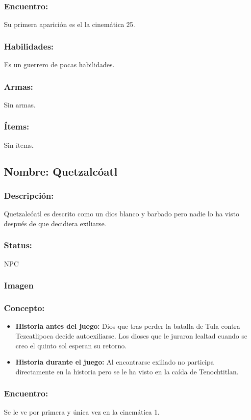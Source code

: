\documentclass[11pt,letterpaper]{article}
\begin{document}
\subsubsection{Encuentro:}
Su primera aparición es el la cinemática 25.
\subsubsection{Habilidades:}
Es un guerrero de pocas habilidades. 
\subsubsection{Armas:}
Sin armas.
\subsubsection{Ítems:}
Sin ítems.


\subsection{Nombre: Quetzalcóatl}  
\subsubsection{Descripción:}
Quetzalcóatl es descrito como un dios blanco y barbado pero nadie lo ha visto después de que decidiera exiliarse.
\subsubsection{Status:}
NPC 
\subsubsection{Imagen}
\subsubsection{Concepto:}
\begin{itemize}
	\item \textbf{Historia antes del juego:}
	Dios que tras perder la batalla de Tula contra Tezcatlipoca decide autoexiliarse. Los dioses que le juraron lealtad cuando se creo el quinto sol esperan su retorno.
	\item \textbf{Historia durante el juego:}
	Al encontrarse exiliado no participa directamente en la historia pero se le ha visto en la caída de Tenochtitlan.
\end{itemize} 
\subsubsection{Encuentro:}
Se le ve por primera y única vez en la cinemática 1.
\end{document}
